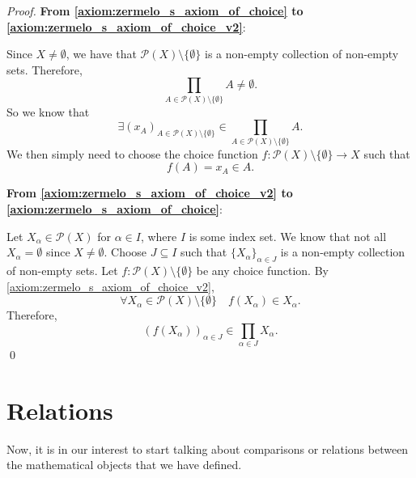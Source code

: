 \documentclass[notoc,notitlepage]{tufte-book}
\begin{document}
\begin{proof}
  \textbf{From \cref{axiom:zermelo_s_axiom_of_choice} to \cref{axiom:zermelo_s_axiom_of_choice_v2}}:

  Since $X \neq \emptyset$, we have that $\mathcal{P}(X) \setminus \{ \emptyset \}$ is a non-empty collection of non-empty sets. Therefore,
  \begin{equation*}
    \prod_{A \in \mathcal{P}(X) \setminus \{ \emptyset \} } A \neq \emptyset.
  \end{equation*}
  So we know that
  \begin{equation*}
    \exists {( x_A )}_{A \in \mathcal{P}(X) \setminus \{ \emptyset \} } \in \prod_{A \in \mathcal{P}(X) \setminus \{ \emptyset \} } A.
  \end{equation*}
  We then simply need to choose the choice function $f : \mathcal{P}(X) \setminus \{ \emptyset \} \to X$ such that
  \begin{equation*}
    f(A) = x_A \in A.
  \end{equation*}

  \noindent\textbf{From \cref{axiom:zermelo_s_axiom_of_choice_v2} to \cref{axiom:zermelo_s_axiom_of_choice}}: 

  Let $X_\alpha \in \mathcal{P}(X)$ for $\alpha \in I$, where $I$ is some index set. We know that not all $X_\alpha = \emptyset$ since $X \neq \emptyset$. Choose $J \subseteq I$ such that ${\{ X_\alpha \}}_{\alpha \in J}$ is a non-empty collection of non-empty sets. Let $f: \mathcal{P}(X) \setminus \{ \emptyset \}$ be any choice function. By \cref{axiom:zermelo_s_axiom_of_choice_v2}, 
  \begin{equation*}
    \forall X_\alpha \in \mathcal{P}(X) \setminus \{ \emptyset \} \quad f(X_\alpha) \in X_\alpha.
  \end{equation*}
  Therefore,
  \begin{equation*}
    {( f(X_\alpha) )}_{\alpha \in J} \in \prod_{\alpha \in J} X_\alpha.
  \end{equation*}\qed\
\end{proof}


\section{Relations}%
\label{sec:relations}

Now, it is in our interest to start talking about comparisons or relations between the mathematical objects that we have defined.
\end{document}

